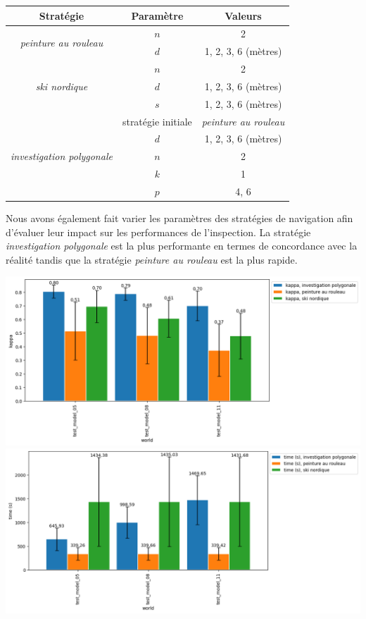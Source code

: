 \documentclass[a0paper,portrait]{baposter}
\begin{document}
\begin{poster}
{			\begin{tabular}{|c|c|c|}
				\hline
				Stratégie & Paramètre & Valeurs \\
				\hline
				\multirow{2}{*}{\textit{peinture au rouleau}} & $n$ & 2 \\
				& $d$ & 1, 2, 3, 6 (mètres) \\
				\hline
				\multirow{3}{*}{\textit{ski nordique}} & $n$ & 2 \\
				& $d$ & 1, 2, 3, 6 (mètres) \\
				& $s$ & 1, 2, 3, 6 (mètres) \\
				\hline
				\multirow{5}{*}{\textit{investigation polygonale}} & stratégie initiale & \textit{peinture au rouleau} \\
				& $d$ & 1, 2, 3, 6 (mètres) \\
				& $n$ & 2 \\
				& $k$ & 1 \\
				& $p$ & 4, 6 \\
				\hline
			\end{tabular}

			\vspace{15pt}

			Nous avons également fait varier les paramètres des stratégies de navigation afin d'évaluer leur impact sur les performances de l'inspection.
			La stratégie \textit{investigation polygonale} est la plus performante en termes de concordance avec la réalité tandis que la stratégie \textit{peinture au rouleau} est la plus rapide.

			\vspace{5pt}

			\includegraphics[width=0.5\linewidth]{graphics/investigation_polygonale-peinture_au_rouleau_ski_nordique-kappa_for_each_world_vs_investigation_polygonale-kappa_for_each_world.png}
			\includegraphics[width=0.5\linewidth]{graphics/investigation_polygonale-peinture_au_rouleau_ski_nordique-time_for_each_world_vs_investigation_polygonale-time_for_each_world.png}
		}
\end{poster}
\end{document}
